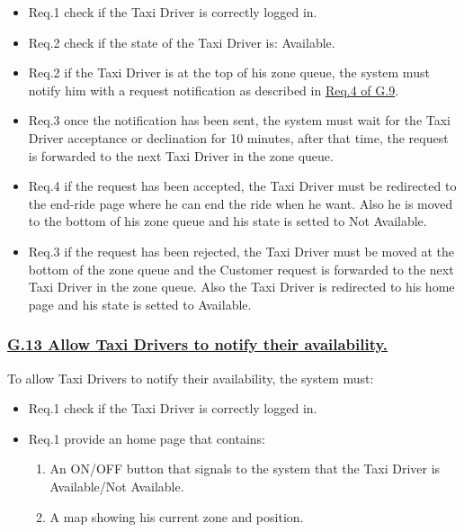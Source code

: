 \documentclass{report}
\begin{document}

				\begin{itemize}
					\item \lbrack Req.1\rbrack \label{sec:fr1_g12} check if the Taxi Driver is correctly logged in.
					\item \lbrack Req.2\rbracl \label{sec:fr2_g12} check if the state of the Taxi Driver is: Available.
					\item \lbrack Req.2\rbrack \label{sec:fr3_g12} if the Taxi Driver is at the top of his zone queue, the system must notify him with a request notification as described in \hyperref[sec:fr4_g9]{Req.4 of G.9}.
					\item \lbrack Req.3\rbrack \label{sec:fr4_g12} once the notification has been sent, the system must wait for the Taxi Driver acceptance or declination for 10 minutes, after that time, the request is forwarded to the next Taxi Driver in the zone queue.
					\item \lbrack Req.4\rbrack \label{sec:fr5_g12} if the request has been accepted, the Taxi Driver must be redirected to the end-ride page where he can end the ride when he want. Also he is moved to the bottom of his zone queue and his state is setted to Not Available.
					\item \lbrack Req.3\rbrack \label{sec:fr6_g12} if the request has been rejected, the Taxi Driver must be moved at the bottom of the zone queue and the Customer request is forwarded to the next Taxi Driver in the zone queue. Also the Taxi Driver is redirected to his home page and his state is setted to Available.
				\end{itemize}


			\subsubsection{\lbrack \hyperref[sec:g13]{G.13 Allow Taxi Drivers to notify their availability.}\rbrack}\label{sec:frs13}
			To allow Taxi Drivers to notify their availability, the system must:
				\begin{itemize}
					\item \lbrack Req.1\rbrack \label{sec:fr1_g13} check if the Taxi Driver is correctly logged in.
					\item \lbrack Req.1\rbrack \label{sec:fr1_g13} provide an home page that contains:
						\begin{enumerate}
							\item An ON/OFF button that signals to the system that the Taxi Driver is Available/Not Available.
							\item A map showing his current zone and position.
						\end{enumerate}
				\end{itemize}
\end{document}
